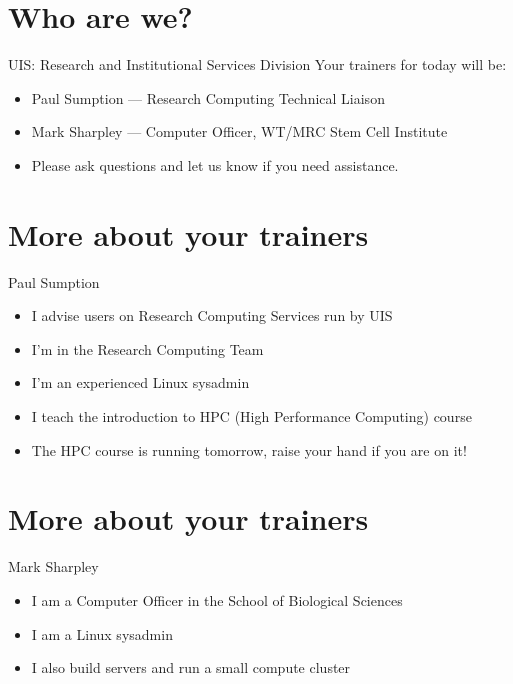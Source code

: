 \section{Who are we?}
\begin{frame}{UIS: Research and Institutional Services Division}
Your trainers for today will be:\\
\begin{itemize}
  \item Paul Sumption --- Research Computing Technical Liaison
    \item Mark Sharpley --- Computer Officer, WT/MRC Stem Cell Institute
  \item\alert{Please ask questions and let us know if you need assistance.}
\end{itemize}
\end{frame}

\section{More about your trainers}
\begin{frame}{Paul Sumption}
\begin{itemize}
  \item I advise users on Research Computing Services run by UIS
  \item I'm in the Research Computing Team
  \item I'm an experienced Linux sysadmin 
  \item I teach the introduction to HPC (High Performance Computing) course
  \item\alert{The HPC course is running tomorrow, raise your hand if you are on it!}
\end{itemize}
\end{frame}

\section{More about your trainers}
\begin{frame}{Mark Sharpley}
\begin{itemize}
  \item I am a Computer Officer in the School of Biological Sciences
  \item I am a Linux sysadmin 
  \item I also build servers and run a small compute cluster 
\end{itemize}
\end{frame}

